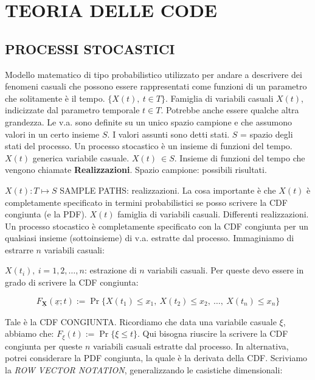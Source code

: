 
\chapter{TEORIA DELLE CODE}
\label{cap:qtheory}

\section{PROCESSI STOCASTICI}

Modello matematico di tipo probabilistico utilizzato per andare a descrivere dei fenomeni casuali che possono essere rappresentati come funzioni di un parametro che solitamente è il tempo. $\{X(t),\ t \in T\}$. Famiglia di variabili casuali $X(t)$, indicizzate dal parametro temporale $t \in T$. Potrebbe anche essere qualche altra grandezza. Le v.a. sono definite su un unico spazio campione e che assumono valori in un certo insieme $S$. I valori assunti sono detti stati. $S$ = spazio degli stati del processo. Un processo stocastico è un insieme di funzioni del tempo. $X(t)$ generica variabile casuale. $X(t)\ \in S$. Insieme di funzioni del tempo che vengono chiamate \textbf{Realizzazioni}. Spazio campione: possibili risultati.

$X(t): T \mapsto S$ SAMPLE PATHS: realizzazioni. La cosa importante è che $X(t)$ è completamente specificato in termini probabilistici se posso scrivere la CDF congiunta (e la PDF). $X(t)$ famiglia di variabili casuali. Differenti realizzazioni. Un processo stocastico è completamente specificato con la CDF congiunta per un qualsiasi insieme (sottoinsieme) di v.a. estratte dal processo. Immaginiamo di estrarre $n$ variabili casuali:

$X(t_i),\ i=1,2,\dots,n$: estrazione di $n$ variabili casuali. Per queste devo essere in grado di scrivere la CDF congiunta:

\[
	F_{\mathbf{\underline{X}}}(\underline{x}; t) := \Pr\{X(t_1) \leq x_1,\ X(t_2) \leq x_2,\ \dots,\ X(t_n) \leq x_n\}
\]

Tale è la CDF CONGIUNTA. Ricordiamo che data una variabile casuale $\xi$, abbiamo che: $F_{\xi}(t) := \Pr\{\xi\leq t\}$. 
Qui bisogna riuscire la scrivere la CDF congiunta per queste $n$ variabili casuali estratte dal processo. In alternativa, potrei considerare la PDF congiunta, la quale è la derivata della CDF. Scriviamo la \textit{ROW VECTOR NOTATION}, generalizzando le casistiche dimensionali:

